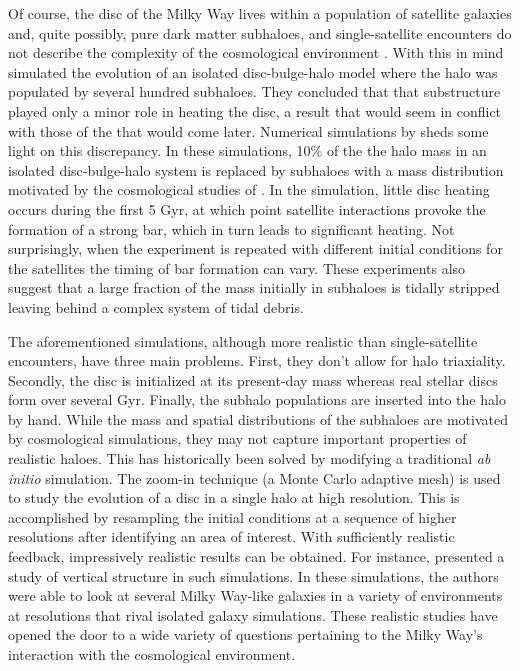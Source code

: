 Of course, the disc of the Milky Way lives within a population of satellite galaxies and, quite possibly, pure dark matter subhaloes, and single-satellite encounters do not describe the complexity of the cosmological environment \citep{Klypin1999,mooresubhalos,springel2008}.  With this in mind \citet{Font2001} simulated the evolution of an isolated disc-bulge-halo model where the halo was populated by several hundred subhaloes.  They concluded that that substructure played only a minor role in heating the disc, a result that would seem in conflict with those of the \citet{kazantzidis2008} that would come later.  Numerical simulations by \citet{gauthier2006, dubinski2008} sheds some light on this discrepancy.  In these simulations, 10\% of the the halo mass in an isolated disc-bulge-halo system is replaced by subhaloes with a mass distribution motivated by the cosmological studies of \citet{gao2004}.  In the \citet{gauthier2006} simulation, little disc heating occurs during the first 5 Gyr, at which point satellite interactions provoke the formation of a strong bar, which in turn leads to significant heating.  Not surprisingly, when the experiment is repeated with different initial conditions for the satellites the timing of bar formation can vary.  These experiments also suggest that a large fraction of the mass initially in subhaloes is tidally stripped leaving behind a complex system of tidal debris.

The aforementioned simulations, although more realistic than single-satellite encounters, have three main problems.  First, they don't allow for halo triaxiality.  Secondly, the disc is initialized at its present-day mass whereas real stellar discs form over several Gyr.  Finally, the subhalo populations are inserted into the halo by hand.  While the mass and spatial distributions of the subhaloes are motivated by cosmological simulations, they may not capture important properties of realistic haloes. This has historically been solved by modifying a traditional \textit{ab initio} simulation. The zoom-in technique (a Monte Carlo adaptive mesh) is used to study the evolution of a disc in a single halo at high resolution.  This is accomplished by resampling the initial conditions at a sequence of higher resolutions after identifying an area of interest. With sufficiently realistic feedback, impressively realistic results can be obtained. For instance, \citet{gomez_2017} presented a study of vertical structure in such simulations. In these simulations, the authors were able to look at several Milky Way-like galaxies in a variety of environments at resolutions that rival isolated galaxy simulations. These realistic studies have opened the door to a wide variety of questions pertaining to the Milky Way's interaction with the cosmological environment.

